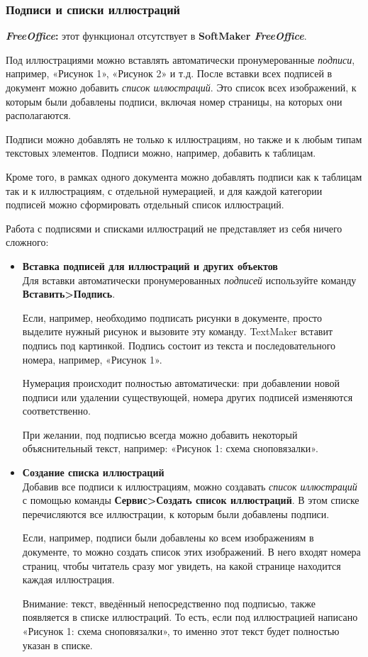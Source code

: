 ﻿\documentclass[a4paper,10pt]{article}
\begin{document}
\subsubsection{Подписи и списки иллюстраций}
\begin{mdframed}[backgroundcolor=pink!50]
\textbf{\textit{FreeOffice}:} этот функционал отсутствует в \textbf{SoftMaker \textit{FreeOffice}}.
\end{mdframed}

Под иллюстрациями можно вставлять автоматически пронумерованные \textit{подписи}, например, «Рисунок 1», «Рисунок 2» и т.д. После вставки всех подписей в документ можно добавить \textit{список иллюстраций}. Это список всех изображений, к которым были добавлены подписи, включая номер страницы, на которых они располагаются.

Подписи можно добавлять не только к иллюстрациям, но также и к любым типам текстовых элементов. Подписи можно, например, добавить к таблицам.

Кроме того, в рамках одного документа можно добавлять подписи как к таблицам так и к иллюстрациям, с отдельной нумерацией, и для каждой категории подписей можно сформировать отдельный список иллюстраций.

Работа с подписями и списками иллюстраций не представляет из себя ничего сложного:

\begin{itemize}
 \item \textbf{Вставка подписей для иллюстраций и других объектов}\\
 Для вставки автоматически пронумерованных \textit{подписей} используйте команду \textbf{Вставить>Подпись}.
 
 Если, например, необходимо подписать рисунки в документе, просто выделите нужный рисунок и вызовите эту команду. TextMaker вставит подпись под картинкой. Подпись состоит из текста и последовательного номера, например, «Рисунок 1».
 
 Нумерация происходит полностью автоматически: при добавлении новой подписи или удалении существующей, номера других подписей изменяются соответственно.
 
 При желании, под подписью всегда можно добавить некоторый объяснительный текст, например: «Рисунок 1: схема сноповязалки».
 \item \textbf{Создание списка иллюстраций}\\
 Добавив все подписи к иллюстрациям, можно создавать \textit{список иллюстраций} с помощью команды \textbf{Сервис>Создать список иллюстраций}. В этом списке перечисляются все иллюстрации, к которым были добавлены подписи.
 
 Если, например, подписи были добавлены ко всем изображениям в документе, то можно создать список этих изображений. В него входят номера страниц, чтобы читатель сразу мог увидеть, на какой странице находится каждая иллюстрация.
 
 Внимание: текст, введённый непосредственно под подписью, также появляется в списке иллюстраций. То есть, если под иллюстрацией написано «Рисунок 1: схема сноповязалки», то именно этот текст будет полностью указан в списке.
 \end{itemize}
 
\end{document}
